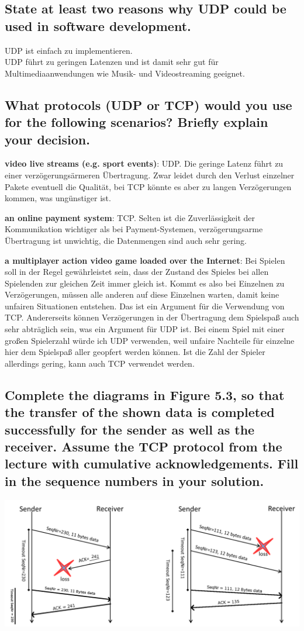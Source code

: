 \documentclass[a4paper,
			llpt,
			solution,
			accentcolor=tud2d,
			colorbacktitle
			]
			{tudexercise}
\begin{document}
\subsection{State at least two reasons why UDP could be used in software development.}
UDP ist einfach zu implementieren.\\
UDP führt zu geringen Latenzen und ist damit sehr gut für Multimediaanwendungen wie Musik- und Videostreaming geeignet.
\subsection{What protocols (UDP or TCP) would you use for the following scenarios? Briefly explain your decision.}
\begin{compactenum}
\item \textbf{video live streams (e.g. sport events)}: UDP. Die geringe Latenz führt zu einer verzögerungsärmeren Übertragung. Zwar leidet durch den Verlust einzelner Pakete eventuell die Qualität, bei TCP könnte es aber zu langen Verzögerungen kommen, was ungünstiger ist.
\item \textbf{an online payment system}: TCP. Selten ist die Zuverlässigkeit der Kommunikation wichtiger als bei Payment-Systemen, verzögerungsarme Übertragung ist unwichtig, die Datenmengen sind auch sehr gering.
\item \textbf{a multiplayer action video game loaded over the Internet}: Bei Spielen soll in der Regel gewährleistet sein, dass der Zustand des Spieles bei allen Spielenden zur gleichen Zeit immer gleich ist. Kommt es also bei Einzelnen zu Verzögerungen, müssen alle anderen auf diese Einzelnen warten, damit keine unfairen Situationen entstehen. Das ist ein Argument für die Verwendung von TCP. Andererseits können Verzögerungen in der Übertragung dem Spielspaß auch sehr abträglich sein, was ein Argument für UDP ist. Bei einem Spiel mit einer großen Spielerzahl würde ich UDP verwenden, weil unfaire Nachteile für einzelne hier dem Spielspaß aller geopfert werden können. Ist die Zahl der Spieler allerdings gering, kann auch TCP verwendet werden.
\end{compactenum}
\subsection{Complete the diagrams in Figure 5.3, so that the transfer of the shown data is completed successfully for the sender as well as the receiver. Assume the TCP protocol from the lecture with cumulative acknowledgements. Fill in the sequence numbers in your solution.}
\includegraphics[width=\textwidth]{haesslon.png}
\end{document}

